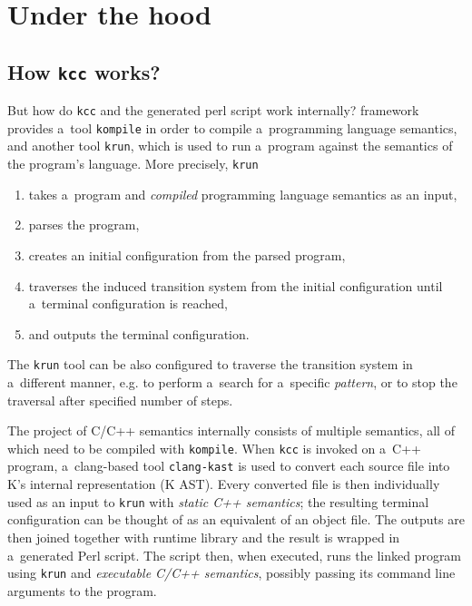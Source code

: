 \documentclass{fithesis3}
\newcommand{\krun}{\texttt{krun}\xspace}
\newcommand{\kompile}{\texttt{kompile}\xspace}
\newcommand{\clangKast}{\texttt{clang-kast}\xspace}
\newcommand{\kcc}{\texttt{kcc}\xspace}
\begin{document}

\section{Under the hood}

\subsection{How \kcc works?}

But how do \kcc and the generated perl script work internally? \K framework provides a~tool \kompile in order to compile a~programming language semantics, and another tool \krun, which is used to run a~program against the semantics of the program's language. More precisely, \krun 
\begin{enumerate}
\item takes a~program and \textit{compiled} programming language semantics as an input,
\item parses the program,
\item creates an initial configuration from the parsed program,
\item traverses the induced transition system from the initial configuration until a~terminal configuration is reached,
\item and outputs the terminal configuration.
\end{enumerate}
The \krun tool can be also configured to traverse the transition system in a~different manner, e.g. to perform a~search for a~specific \textit{pattern}, or to stop the traversal after specified number of steps.

The project of C/C++ semantics internally consists of multiple \K semantics, all of which need to be compiled with \kompile. When \kcc is invoked on a~C++ program, a~clang-based tool \clangKast is used to convert each source file into K's internal representation (K AST). Every converted file is then individually used as an input to \krun with \textit{static C++ semantics}; the resulting terminal configuration can be thought of as an equivalent of an object file. The outputs are then joined together with runtime library and the result is wrapped in a~generated Perl script. The script then, when executed, runs the linked program using \krun and \textit{executable C/C++ semantics}, possibly passing its command line arguments to the program.
\end{document}
